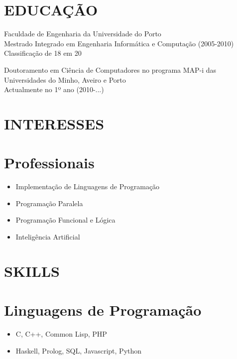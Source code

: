 \documentclass[margin]{res}
\begin{document}


\address{ Rua 1º de Maio, nº 48 \\   3515-560 Bodiosa \\   (+351) 934 908 448 \\ flaviocruz@gmail.com \\ \url{http://flaviocruz.net}}      
                        
\begin{resume}

\section{EDUCAÇÃO}       Faculdade de Engenharia da Universidade do Porto \\
                Mestrado Integrado em Engenharia Informática e Computação (2005-2010) \\
                Classificação de 18 em 20
                
                Doutoramento em Ciência de Computadores no programa MAP-i das Universidades do Minho, Aveiro e Porto \\
                Actualmente no 1º ano (2010-...)

\section{INTERESSES}

\normalsize{\section{Professionais}} 
                 \begin{itemize}
                  \item Implementação de Linguagens de Programação
                  \item Programação Paralela
                  \item Programação Funcional e Lógica
                  \item Inteligência Artificial
                  \end{itemize}
\section{SKILLS} 
\normalsize{\section{Linguagens de Programação}}
                 \begin{itemize}
                 \item C, C++, Common Lisp, PHP
                 \item Haskell, Prolog, SQL, Javascript, Python
                 \end{itemize}
                 

\end{resume}
\end{document}

